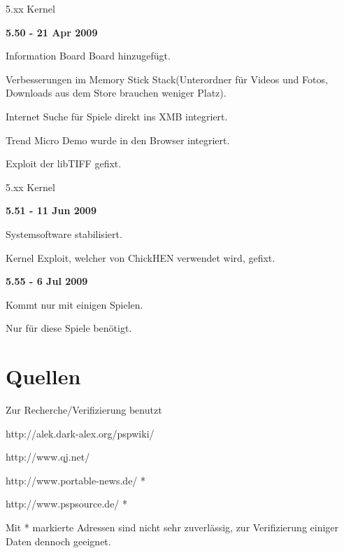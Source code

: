 \documentclass[mode=print,paper=screen,style=jefka]{powerdot}
\begin{document}
\begin{slide}{5.xx Kernel}
	\begin{large}\textbf{5.50 - 21 Apr 2009}\end{large}
	\begin{list}{-}{}
		\item{Information Board Board hinzugefügt.}
		\item{Verbesserungen im Memory Stick Stack(Unterordner für Videos und Fotos, Downloads aus dem Store brauchen weniger Platz).}
		\item{Internet Suche für Spiele direkt ins XMB integriert.}
		\item{Trend Micro Demo wurde in den Browser integriert.}
		\item{Exploit der libTIFF gefixt.} 
	\end{list}
\end{slide}

\begin{slide}{5.xx Kernel}
	\begin{large}\textbf{5.51 - 11 Jun 2009}\end{large}
	\begin{list}{-}{}
		\item{Systemsoftware stabilisiert.}
		\item{Kernel Exploit, welcher von ChickHEN verwendet wird, gefixt.} 
	\end{list}
	\begin{large}\textbf{5.55 - 6 Jul 2009}\end{large}
	\begin{list}{-}{}
		\item{Kommt nur mit einigen Spielen.}
		\item{Nur für diese Spiele benötigt.} 
	\end{list}
\end{slide}



\section{Quellen}
\begin{slide}{Zur Recherche/Verifizierung benutzt}
	\begin{list}{-}{}
		\item{http://alek.dark-alex.org/pspwiki/}
		\item{http://www.qj.net/}
		\item{http://www.portable-news.de/ *}
		\item{http://www.pspsource.de/ *}
	\end{list}
	Mit * markierte Adressen sind nicht sehr zuverlässig, zur Verifizierung einiger Daten dennoch geeignet.
\end{slide}
\end{document}

